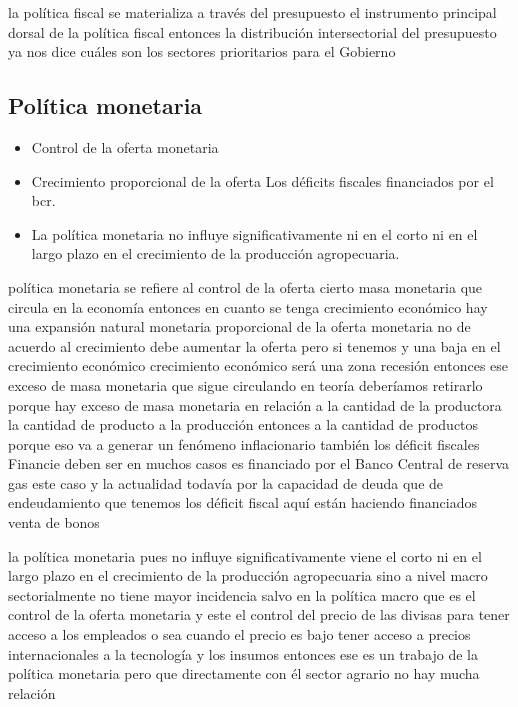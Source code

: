\documentclass[
  a4paper,
]{article}
\begin{document}
la política fiscal se materializa a través del presupuesto el
instrumento principal dorsal de la política fiscal entonces la
distribución intersectorial del presupuesto ya nos dice cuáles son los
sectores prioritarios para el Gobierno

\hypertarget{poluxedtica-monetaria}{%
\subsection{Política monetaria}\label{poluxedtica-monetaria}}

\begin{itemize}
\item
  Control de la oferta monetaria
\item
  Crecimiento proporcional de la oferta Los déficits fiscales
  financiados por el bcr.
\item
  La política monetaria no influye significativamente ni en el corto ni
  en el largo plazo en el crecimiento de la producción agropecuaria.
\end{itemize}

política monetaria se refiere al control de la oferta cierto masa
monetaria que circula en la economía entonces en cuanto se tenga
crecimiento económico hay una expansión natural monetaria proporcional
de la oferta monetaria no de acuerdo al crecimiento debe aumentar la
oferta pero si tenemos y una baja en el crecimiento económico
crecimiento económico será una zona recesión entonces ese exceso de masa
monetaria que sigue circulando en teoría deberíamos retirarlo porque hay
exceso de masa monetaria en relación a la cantidad de la productora la
cantidad de producto a la producción entonces a la cantidad de productos
porque eso va a generar un fenómeno inflacionario también los déficit
fiscales Financie deben ser en muchos casos es financiado por el Banco
Central de reserva gas este caso y la actualidad todavía por la
capacidad de deuda que de endeudamiento que tenemos los déficit fiscal
aquí están haciendo financiados venta de bonos

la política monetaria pues no influye significativamente viene el corto
ni en el largo plazo en el crecimiento de la producción agropecuaria
sino a nivel macro sectorialmente no tiene mayor incidencia salvo en la
política macro que es el control de la oferta monetaria y este el
control del precio de las divisas para tener acceso a los empleados o
sea cuando el precio es bajo tener acceso a precios internacionales a la
tecnología y los insumos entonces ese es un trabajo de la política
monetaria pero que directamente con él sector agrario no hay mucha
relación
\end{document}
